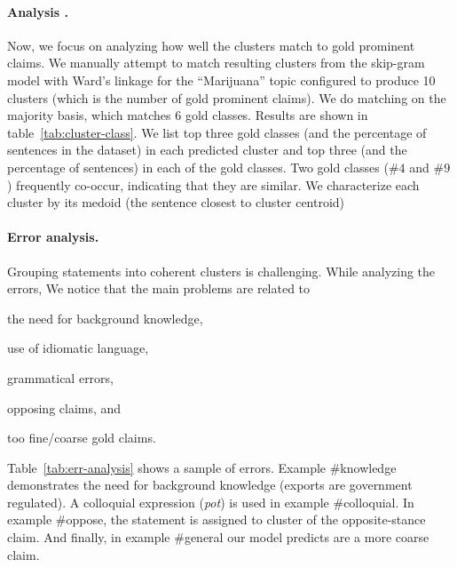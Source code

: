 \paragraph{Analysis .} 
Now, we focus on analyzing how well the clusters match to gold 
prominent claims. 
We manually attempt to match resulting clusters from 
the skip-gram model with Ward's linkage for the ``Marijuana'' topic configured
to produce 10 clusters (which is the number of gold prominent claims). 
We do matching on the majority basis, which matches 6 gold classes. 
Results are shown in table~\ref{tab:cluster-class}. 
We list top three gold classes (and the percentage of sentences in the dataset) 
in each predicted cluster and top three
(and the percentage of sentences) in each of the gold classes. 
Two gold classes  ($\#4$ and $\#9$) frequently co-occur, indicating 
that they are similar. 
We characterize each cluster by its medoid (the sentence closest to cluster centroid)

\paragraph{Error analysis.}
Grouping statements into coherent clusters is challenging. 
While analyzing the errors, We notice that the main problems are related to \begin{enumerate*}
\item the need for background knowledge, 
\item use of idiomatic language, 
\item grammatical errors, 
\item opposing claims, and 
\item too fine/coarse gold claims.
\end{enumerate*}
Table~\ref{tab:err-analysis} shows a sample of errors. 
Example \#knowledge demonstrates the need for background knowledge 
(exports are government regulated). 
A colloquial expression (\emph{pot}) is used in example \#colloquial. 
In example \#oppose, the statement is assigned to cluster of the opposite-stance
claim. 
And finally, in example \#general our model predicts are a more coarse claim. 

